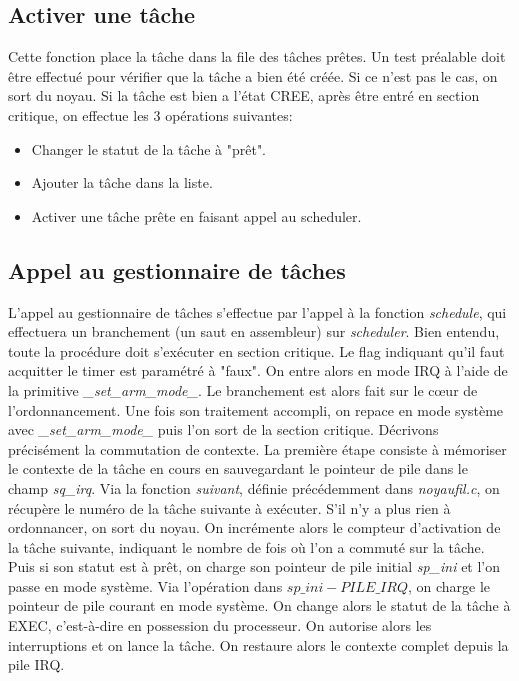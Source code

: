 \subsection{Activer une tâche}
Cette fonction place la tâche dans la file des tâches prêtes.
Un test préalable doit être effectué pour vérifier que la tâche a bien été créée. Si ce n'est pas le cas, on sort du noyau. Si la tâche est bien a l'état CREE, après être entré en section critique, on effectue les 3 opérations suivantes:
\begin{itemize}
    \item Changer le statut de la tâche à "prêt".
    \item Ajouter la tâche dans la liste.
    \item Activer une tâche prête en faisant appel au scheduler.
\end{itemize}
%

\subsection{Appel au gestionnaire de tâches}
L'appel au gestionnaire de tâches s'effectue par l'appel à la fonction \textit{schedule}, qui effectuera un branchement (un saut en assembleur) sur \textit{scheduler}.
Bien entendu, toute la procédure doit s'exécuter en section critique. Le flag indiquant qu'il faut acquitter le timer est paramétré à "faux". On entre alors en mode IRQ à l'aide de la primitive \textit{\_set\_arm\_mode\_}. Le branchement est alors fait sur le cœur de l'ordonnancement. Une fois son traitement accompli, on repace en mode système avec \textit{\_set\_arm\_mode\_} puis l'on sort de la section critique.
Décrivons précisément la commutation de contexte. La première étape consiste à mémoriser le contexte de la tâche en cours en sauvegardant le pointeur de pile dans le champ \textit{sq\_irq}. Via la fonction \textit{suivant}, définie précédemment dans \textit{noyaufil.c}, on récupère le numéro de la tâche suivante à exécuter. S'il n'y a plus rien à ordonnancer, on sort du noyau. On incrémente alors le compteur d'activation de la tâche suivante, indiquant le nombre de fois où l'on a commuté sur la tâche. Puis si son statut est à prêt, on charge son pointeur de pile initial \textit{sp\_ini} et l'on passe en mode système. Via l'opération dans $sp\_ini - PILE\_IRQ$, on charge le pointeur de pile courant en mode système. On change alors le statut de la tâche à EXEC, c'est-à-dire en possession du processeur. On autorise alors les interruptions et on lance la tâche. On restaure alors le contexte complet depuis la pile IRQ.
%
%


